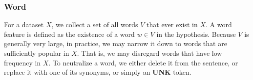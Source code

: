 \subsubsection{Word} 
For a dataset $X$, we collect a set of all words 
$V$ that ever exist in $X$. 
A word feature is defined as the existence of a word $w \in V$
in the hypothesis. 
Because $V$ is generally very large, in practice, we may narrow it down
to words that are sufficiently popular in $X$. That is, we may disregard 
words that have low frequency in $X$.
To neutralize a word, we either delete it from the sentence, or replace it with one of its
synonyms, or simply an \textbf{UNK} token.
%

%

